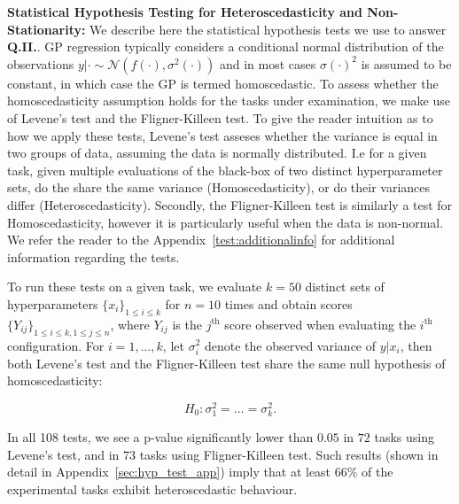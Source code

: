 \documentclass[jair,twoside,11pt,theapa]{article}
\theoremstyle{definition}
\begin{document}
\noindent \textbf{Statistical Hypothesis Testing for Heteroscedasticity and Non-Stationarity:} We describe here the statistical hypothesis tests we use to answer \textbf{Q.II.}. GP regression typically considers a conditional normal distribution of the observations $y | \cdot \sim \mathcal{N}(f(\cdot), \sigma^2(\cdot))$ and in most cases $\sigma(\cdot)^2$ is assumed to be constant, in which case the GP is termed homoscedastic. To assess whether the homoscedasticity assumption holds for the tasks under examination, we make use of Levene's test and the Fligner-Killeen test. To give the reader intuition as to how we apply these tests, Levene’s test asseses whether the variance is equal in two groups of data, assuming the data is normally distributed. I.e for a given task, given multiple evaluations of the black-box of two distinct hyperparameter sets, do the share the same variance (Homoscedasticity), or do their variances differ (Heteroscedasticity). Secondly, the Fligner-Killeen test is similarly a test for Homoscedasticity, however it is particularly useful when the data is non-normal. We refer the reader to the Appendix~\ref{test:additionalinfo} for additional information regarding the tests. 

To run these tests on a given task, we evaluate $k=50$ distinct sets of hyperparameters $\{x_i\}_{1\leq i \leq k}$ for $n=10$ times and obtain scores $\{Y_{i j}\}_{1\leq i \leq k, 1 \leq j \leq n}$, where $Y_{i j}$ is the $j^\text{th}$ score observed when evaluating the $i^\text{th}$ configuration. For $i = 1, \dots, k$, let $\sigma_i^2$ denote the observed variance of $y | x_i$, then both Levene's test and the Fligner-Killeen test share the same null hypothesis of homoscedasticity:

\begin{equation*}
    H_0: \sigma_1^2 = \dots = \sigma_k^2.
\end{equation*}

In all 108 tests, we see a p-value significantly lower than $0.05$ in $72$ tasks using Levene's test, and in $73$ tasks using Fligner-Killeen test. Such results (shown in detail in Appendix~\ref{sec:hyp_test_app}) imply that at least $66\%$ of the experimental tasks exhibit heteroscedastic behaviour. \\
\end{document}
